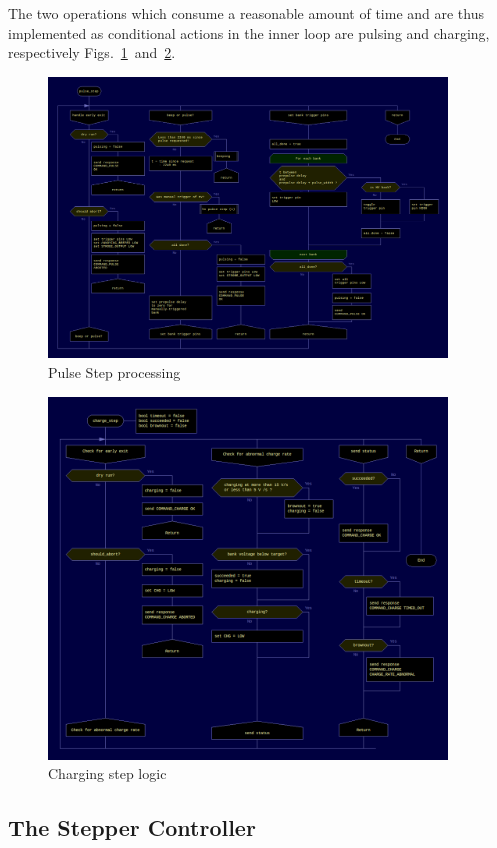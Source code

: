 The two operations which consume a reasonable amount of time and are thus implemented as conditional actions in the inner loop are pulsing and charging, respectively Figs.~\ref{fig:pulse_step}~and~\ref{fig:charge_step}.

\begin{figure}
  \includegraphics[width=400px]{pulse_step.png}
\caption{\label{fig:pulse_step} Pulse Step processing}
\end{figure}

\begin{figure}
  \includegraphics[width=400px]{charge_step.png}
\caption{\label{fig:charge_step} Charging step logic}
\end{figure}

\subsection{The Stepper Controller}


